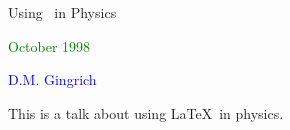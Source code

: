 \documentclass{slides}
\begin{document}
\begin{center}

\LARGE

\color{red}

Using \LaTeXe\ in Physics

\end{center}

\vskip 10cm

\textcolor{green}{October 1998}

\hfill

\textcolor{blue}{D.M. Gingrich}

\begin{slide}

This is a talk about using \LaTeX\ in physics.

\end{slide}
\end{document}
